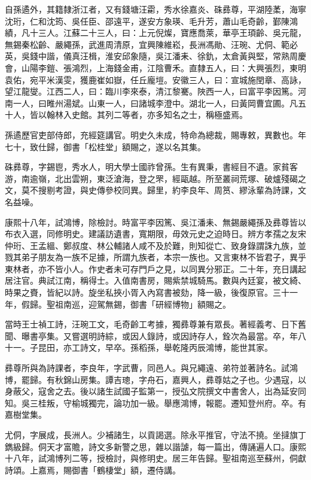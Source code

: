 \begin{pinyinscope}
自孫遹外，其籍隸浙江者，又有錢塘汪霦，秀水徐嘉炎、硃彞尊，平湖陸葇，海寧沈珩，仁和沈筠、吳任臣、邵遠平，遂安方象瑛、毛升芳，蕭山毛奇齡，鄞陳鴻績，凡十三人。江蘇二十三人，曰：上元倪燦，寶應喬萊，華亭王頊齡、吳元龍，無錫秦松齡、嚴繩孫，武進周清原，宜興陳維崧，長洲馮勛、汪琬、尤侗、範必英，吳錢中諧，儀真汪楫，淮安邱象隨，吳江潘耒、徐釚，太倉黃與堅，常熟周慶會，山陽李鎧、張鴻烈，上海錢金甫，江陰曹禾。直隸五人，曰：大興張烈，東明袁佑，宛平米漢雯，獲鹿崔如嶽，任丘龐塏。安徽三人，曰：宣城施閏章、高詠，望江龍燮。江西二人，曰：臨川李來泰，清江黎騫。陜西一人，曰富平李因篤。河南一人，曰睢州湯斌。山東一人，曰諸城李澄中。湖北一人，曰黃岡曹宜圃。凡五十人，皆以翰林入史館。其列二等者，亦多知名之士，稱極盛焉。

孫遹歷官吏部侍郎，充經筵講官。明史久未成，特命為總裁，賜專敕，異數也。年七十，致仕歸，御書「松桂堂」額賜之，遂以名其集。

硃彞尊，字錫鬯，秀水人，明大學士國祚曾孫。生有異秉，書經目不遺。家貧客游，南逾嶺，北出雲朔，東泛滄海，登之罘，經甌越。所至叢祠荒塚、破爐殘碣之文，莫不搜剔考證，與史傳參校同異。歸里，約李良年、周筼、繆泳輩為詩課，文名益噪。

康熙十八年，試鴻博，除檢討。時富平李因篤、吳江潘耒、無錫嚴繩孫及彞尊皆以布衣入選，同修明史。建議訪遺書，寬期限，毋效元史之迫時日。辨方孝孺之友宋仲珩、王孟縕、鄭叔度、林公輔諸人咸不及於難，則知從亡、致身錄謂誅九族，並戮其弟子朋友為一族不足據，所謂九族者，本宗一族也。又言東林不皆君子，異乎東林者，亦不皆小人。作史者未可存門戶之見，以同異分邪正。二十年，充日講起居注官。典試江南，稱得士。入值南書房，賜紫禁城騎馬。數與內廷宴，被文綺、時果之賚，皆紀以詩。旋坐私挾小胥入內寫書被劾，降一級，後復原官。三十一年，假歸。聖祖南巡，迎駕無錫，御書「研經博物」額賜之。

當時王士禎工詩，汪琬工文，毛奇齡工考據，獨彞尊兼有眾長。著經義考、日下舊聞、曝書亭集。又嘗選明詩綜，或因人錄詩，或因詩存人，銓次為最當。卒，年八十一。子昆田，亦工詩文，早卒。孫稻孫，舉乾隆丙辰鴻博，能世其家。

彞尊所與為詩課者，李良年，字武曹，同邑人。與兄繩遠、弟符並著詩名。試鴻博，罷歸。有秋錦山房集。譚吉璁，字舟石，嘉興人，彞尊姑之子也。少遇寇，以身蔽父，寇舍之去。後以諸生試國子監第一，授弘文院撰文中書舍人，出為延安同知。吳三桂叛，守榆城獨完，論功加一級。舉應鴻博，報罷。遷知登州府。卒。有嘉樹堂集。

尤侗，字展成，長洲人。少補諸生，以貢謁選。除永平推官，守法不撓。坐撻旗丁鐫級歸。侗天才富贍，詩文多新警之思，雜以諧謔，每一篇出，傳誦遍人口。康熙十八年，試鴻博列二等，授檢討，與修明史。居三年告歸。聖祖南巡至蘇州，侗獻詩頌。上嘉焉，賜御書「鶴棲堂」額，遷侍講。


\end{pinyinscope}

